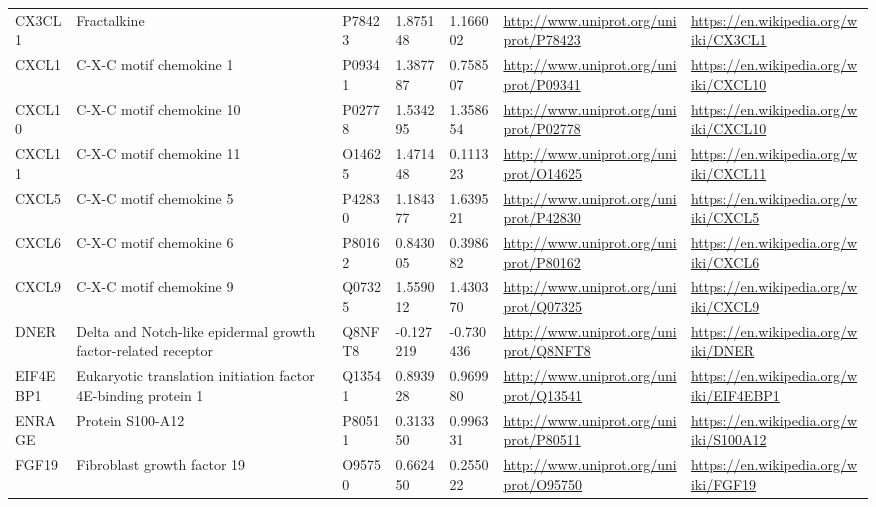 \begin{table}[H]
\begin{tabular}{ lllllll }
        \multicolumn{1}{l|}{ CX3CL1 } &  Fractalkine   & P78423   & 1.875148   & 1.166002   & \url{http://www.uniprot.org/uniprot/P78423}   & \url{https://en.wikipedia.org/wiki/CX3CL1}          \\ 
        \multicolumn{1}{l|}{ CXCL1 } &  C-X-C motif chemokine 1   & P09341   & 1.387787   & 0.758507   & \url{http://www.uniprot.org/uniprot/P09341}   & \url{https://en.wikipedia.org/wiki/CXCL10}          \\ 
        \multicolumn{1}{l|}{ CXCL10 } &  C-X-C motif chemokine 10   & P02778   & 1.534295   & 1.358654   & \url{http://www.uniprot.org/uniprot/P02778}   & \url{https://en.wikipedia.org/wiki/CXCL10}          \\ 
        \multicolumn{1}{l|}{ CXCL11 } &  C-X-C motif chemokine 11   & O14625   & 1.471448   & 0.111323   & \url{http://www.uniprot.org/uniprot/O14625}   & \url{https://en.wikipedia.org/wiki/CXCL11}          \\ 
        \multicolumn{1}{l|}{ CXCL5 } &  C-X-C motif chemokine 5   & P42830   & 1.184377   & 1.639521   & \url{http://www.uniprot.org/uniprot/P42830}   & \url{https://en.wikipedia.org/wiki/CXCL5}          \\ 
        \multicolumn{1}{l|}{ CXCL6 } &  C-X-C motif chemokine 6   & P80162   & 0.843005   & 0.398682   & \url{http://www.uniprot.org/uniprot/P80162}   & \url{https://en.wikipedia.org/wiki/CXCL6}          \\ 
        \multicolumn{1}{l|}{ CXCL9 } &  C-X-C motif chemokine 9   & Q07325   & 1.559012   & 1.430370   & \url{http://www.uniprot.org/uniprot/Q07325}   & \url{https://en.wikipedia.org/wiki/CXCL9}          \\ 
        \multicolumn{1}{l|}{ DNER } &  Delta and Notch-like epidermal growth factor-related receptor   & Q8NFT8   & -0.127219   & -0.730436   & \url{http://www.uniprot.org/uniprot/Q8NFT8}   & \url{https://en.wikipedia.org/wiki/DNER}          \\ 
        \multicolumn{1}{l|}{ EIF4EBP1 } &  Eukaryotic translation initiation factor 4E-binding protein 1   & Q13541   & 0.893928   & 0.969980   & \url{http://www.uniprot.org/uniprot/Q13541}   & \url{https://en.wikipedia.org/wiki/EIF4EBP1}          \\ 
        \multicolumn{1}{l|}{ ENRAGE } &  Protein S100-A12   & P80511   & 0.313350   & 0.996331   & \url{http://www.uniprot.org/uniprot/P80511}   & \url{https://en.wikipedia.org/wiki/S100A12}          \\ 
        \multicolumn{1}{l|}{ FGF19 } &  Fibroblast growth factor 19   & O95750   & 0.662450   & 0.255022   & \url{http://www.uniprot.org/uniprot/O95750}   & \url{https://en.wikipedia.org/wiki/FGF19}          \\ 

\end{tabular}
\end{table}
